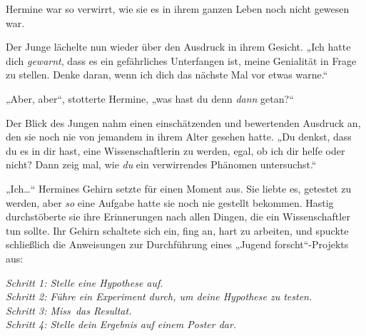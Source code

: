 Hermine war so verwirrt, wie sie es in ihrem ganzen Leben noch nicht gewesen war.

Der Junge lächelte nun wieder über den Ausdruck in ihrem Gesicht. „Ich hatte dich \emph{gewarnt}, dass es ein gefährliches Unterfangen ist, meine Genialität in Frage zu stellen. Denke daran, wenn ich dich das nächste Mal vor etwas warne.“

„Aber, aber“, stotterte Hermine, „was hast du denn \emph{dann} getan?“

Der Blick des Jungen nahm einen einschätzenden und bewertenden Ausdruck an, den sie noch nie von jemandem in ihrem Alter gesehen hatte. „Du denkst, dass du es in dir hast, eine Wissenschaftlerin zu werden, egal, ob ich dir helfe oder nicht? Dann zeig mal, wie \emph{du} ein verwirrendes Phänomen untersuchst.“

„Ich…“ Hermines Gehirn setzte für einen Moment aus. Sie liebte es, getestet zu werden, aber \emph{so} eine Aufgabe hatte sie noch nie gestellt bekommen. Hastig durchstöberte sie ihre Erinnerungen nach allen Dingen, die ein Wissenschaftler tun sollte. Ihr Gehirn schaltete sich ein, fing an, hart zu arbeiten, und spuckte schließlich die Anweisungen zur Durchführung eines „Jugend forscht“-Projekts aus:

\emph{%
Schritt 1: Stelle eine Hypothese auf.\\
Schritt 2: Führe ein Experiment durch, um deine Hypothese zu testen.\\
Schritt 3: Miss~das Resultat.\\
Schritt 4: Stelle dein Ergebnis auf einem Poster dar.%
}

